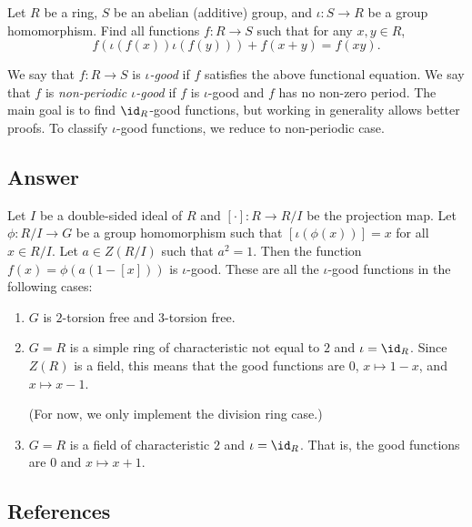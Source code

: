 Let $R$ be a ring, $S$ be an abelian (additive) group, and $\iota : S \to R$ be a group homomorphism.
Find all functions $f : R \to S$ such that for any $x, y \in R$,
\[ f(\iota(f(x)) \iota(f(y))) + f(x + y) = f(xy). \tag{*}\label{2017a6-eq0} \]

We say that $f : R \to S$ is \emph{$\iota$-good} if $f$ satisfies the above functional equation.
We say that $f$ is \emph{non-periodic $\iota$-good} if $f$ is $\iota$-good and $f$ has no non-zero period.
The main goal is to find $\id_R$-good functions, but working in generality allows better proofs.
To classify $\iota$-good functions, we reduce to non-periodic case.





\subsection*{Answer}

Let $I$ be a double-sided ideal of $R$ and $[\cdot] : R \to R/I$ be the projection map.
Let $\phi : R/I \to G$ be a group homomorphism such that $[\iota(\phi(x))] = x$ for all $x \in R/I$.
Let $a \in Z(R/I)$ such that $a^2 = 1$.
Then the function $f(x) = \phi(a(1 - [x]))$ is $\iota$-good.
These are all the $\iota$-good functions in the following cases:
\begin{enumerate}

    \item 
    $G$ is $2$-torsion free and $3$-torsion free.
    
    \item
    $G = R$ is a simple ring of characteristic not equal to $2$ and $\iota = \id_R$.
    Since $Z(R)$ is a field, this means that the good functions are $0$, $x \mapsto 1 - x$, and $x \mapsto x - 1$.

    (For now, we only implement the division ring case.)
    
    \item
    $G = R$ is a field of characteristic $2$ and $\iota = \id_R$.
    That is, the good functions are $0$ and $x \mapsto x + 1$.

\end{enumerate}





\subsection*{References}


